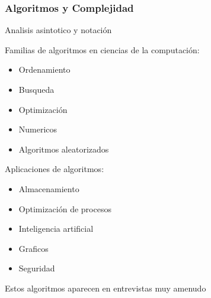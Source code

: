 \documentclass{beamer}
\begin{document}
\begin{frame}
\frametitle{Algoritmos y Complejidad}
\begin{itemize}
    \item{Analisis asintotico y notaci\'on}
    \item{Familias de algoritmos en ciencias de la computaci\'on:
    \begin{itemize}
        \item{Ordenamiento}
        \item{Busqueda}
        \item{Optimizaci\'on}
        \item{Numericos}
        \item{Algoritmos aleatorizados}
    \end{itemize}
    \item{Aplicaciones de algoritmos:
    \begin{itemize}
        \item{Almacenamiento}
        \item{Optimizaci\'on de procesos}
        \item{Inteligencia artificial}
        \item{Graficos}
        \item{Seguridad}
    \end{itemize}
    }
    \item{Estos algoritmos aparecen en entrevistas muy amenudo}
    }
\end{itemize}
\end{frame}
\end{document}
